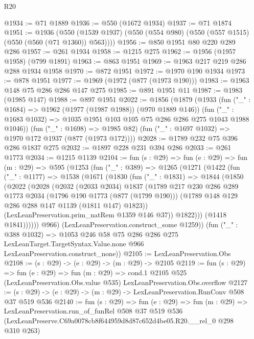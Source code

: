 \begin{lexlean}{R20}
\begin{coremodule}
@1934 := @71 @1889
@1936 := @550 (@1672 @1934)
@1937 := @71 @1874
@1951 := @1936
    (@550 (@1539 @1937) (@550 (@554 @980) (@550 (@557 @1515) (@550 (@560 (@71 @1360)) @563))))
@1956 := @850 @1951 @80 @220 @289 @286
@1957 := @261 @1934
@1958 := @1215 @275
@1962 := @1956 (@1957 @1958) (@799 @1891)
@1963 := @863 @1951
@1969 := @1963 @217 @219 @286 @288 @1934 @1958
@1970 := @872 @1951
@1972 := @1970 @190 @1934
@1973 := @878 @1951
@1977 := @1969 (@1972 (@877 (@1973 @190)))
@1983 := @1963 @148 @75 @286 @286 @147 @275
@1985 := @891 @1951 @11
@1987 := @1983 (@1985 @147)
@1988 := @897 @1951
@2022 := @1856
    (@1879
      (@1933
        (fun ("_" : @1684) => @1962 (@1977 (@1987 @1988)) (@970 @1889 @146))
        (fun ("_" : @1683 @1032) => @1035 @1951 @103 @105 @75 @286 @286 @275 @1043 @1988 @1046))
      (fun ("_" : @1698) => @1985 @82)
      (fun ("_" : @1697 @1032) => @1970 @172 @1937 (@877 (@1973 @172))))
@2028 := @1789 @232 @75 @396 @286 @1837 @275
@2032 := @1897 @228 @231 @394 @286
@2033 := @261 @1773
@2034 := @1215 @1139
@2104 := fun (s : @29) =>
  fun (e : @29) =>
  fun (m : @29) =>
  @595
    (@1253
      (fun ("_" : @389) =>
      @1265
        (@1271
          (@1422
            (fun ("_" : @1177) =>
            @1538
              (@1671
                (@1830
                  (fun ("_" : @1831) =>
                  @1844
                    (@1850
                      (@2022
                        (@2028
                          (@2032
                            (@2033 @2034)
                            @1837
                            (@1789
                              @217
                              @230
                              @286
                              @289
                              @1773
                              @2034
                              (@1796 @190 @1773 (@877 (@1799 @190)))
                              (@1789 @148 @129 @286 @288 @147 @1139 (@1811 @147) @1823))
                            (LexLeanPreservation.prim_natRem @1359 @146 @37))
                          @1822)))
                    (@1418 @1841))))))
          @966)
        (LexLeanPreservation.construct_some @1259))
      (fun ("_" : @388 @1032) =>
      @1053
        @246
        @58
        @75
        @286
        @286
        @275
        LexLeanTarget.TargetSyntax.Value.none
        @966
        LexLeanPreservation.construct_none))
@2105 := LexLeanPreservation.Obs
@2108 := (s : @29) -> (e : @29) -> (m : @29) -> @2105
@2119 := fun (s : @29) =>
  fun (e : @29) =>
  fun (m : @29) =>
  cond.{1} @2105 @525 (LexLeanPreservation.Obs.value @535) LexLeanPreservation.Obs.overflow
@2127 := (s : @29) -> (e : @29) -> (m : @29) -> LexLeanPreservation.RunConv @508 @37 @519 @536
@2140 := fun (s : @29) =>
  fun (e : @29) =>
  fun (m : @29) =>
  LexLeanPreservation.run_of_funRel
    @508
    @37
    @519
    @536
    (LexLeanPreserve.C69a0078cb8f644959d8d87c652d4be05.R20.__rel_0 @298 @310 @263)
\end{coremodule}
\end{lexlean}
